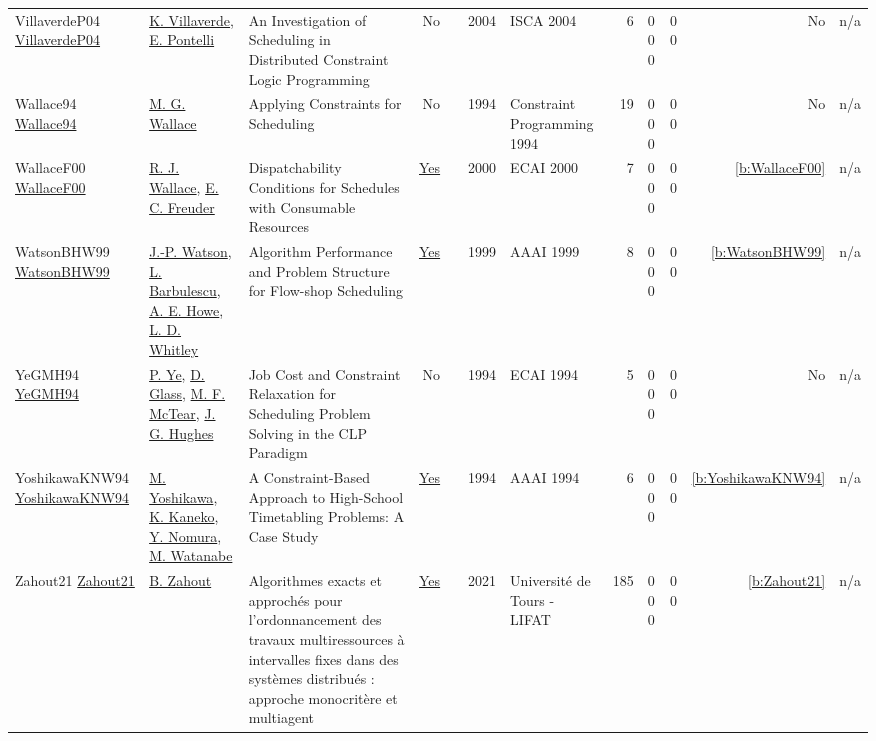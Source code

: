 {\begin{longtable}{>{\raggedright\arraybackslash}p{3cm}>{\raggedright\arraybackslash}p{4.5cm}>{\raggedright\arraybackslash}p{6.0cm}rrrp{2.5cm}rp{1cm}p{1cm}rr}
VillaverdeP04 \href{}{VillaverdeP04} & \hyperref[auth:a658]{K. Villaverde}, \hyperref[auth:a33]{E. Pontelli} & An Investigation of Scheduling in Distributed Constraint Logic Programming & No & \cite{VillaverdeP04} & 2004 & ISCA 2004 & 6 & 0 0 0 & 0 0 & No & n/a\\
Wallace94 \href{}{Wallace94} & \hyperref[auth:a117]{M. G. Wallace} & Applying Constraints for Scheduling & No & \cite{Wallace94} & 1994 & Constraint Programming 1994 & 19 & 0 0 0 & 0 0 & No & n/a\\
WallaceF00 \href{}{WallaceF00} & \hyperref[auth:a1269]{R. J. Wallace}, \hyperref[auth:a273]{E. C. Freuder} & Dispatchability Conditions for Schedules with Consumable Resources & \href{../works/WallaceF00.pdf}{Yes} & \cite{WallaceF00} & 2000 & ECAI 2000 & 7 & 0 0 0 & 0 0 & \ref{b:WallaceF00} & n/a\\
WatsonBHW99 \href{http://www.aaai.org/Library/AAAI/1999/aaai99-098.php}{WatsonBHW99} & \hyperref[auth:a360]{J.-P. Watson}, \hyperref[auth:a1315]{L. Barbulescu}, \hyperref[auth:a1316]{A. E. Howe}, \hyperref[auth:a1317]{L. D. Whitley} & Algorithm Performance and Problem Structure for Flow-shop Scheduling & \href{../works/WatsonBHW99.pdf}{Yes} & \cite{WatsonBHW99} & 1999 & AAAI 1999 & 8 & 0 0 0 & 0 0 & \ref{b:WatsonBHW99} & n/a\\
YeGMH94 \href{}{YeGMH94} & \hyperref[auth:a1258]{P. Ye}, \hyperref[auth:a1259]{D. Glass}, \hyperref[auth:a1260]{M. F. McTear}, \hyperref[auth:a1261]{J. G. Hughes} & Job Cost and Constraint Relaxation for Scheduling Problem Solving in the {CLP} Paradigm & No & \cite{YeGMH94} & 1994 & ECAI 1994 & 5 & 0 0 0 & 0 0 & No & n/a\\
YoshikawaKNW94 \href{http://www.aaai.org/Library/AAAI/1994/aaai94-171.php}{YoshikawaKNW94} & \hyperref[auth:a1280]{M. Yoshikawa}, \hyperref[auth:a1281]{K. Kaneko}, \hyperref[auth:a1282]{Y. Nomura}, \hyperref[auth:a1283]{M. Watanabe} & A Constraint-Based Approach to High-School Timetabling Problems: {A} Case Study & \href{../works/YoshikawaKNW94.pdf}{Yes} & \cite{YoshikawaKNW94} & 1994 & AAAI 1994 & 6 & 0 0 0 & 0 0 & \ref{b:YoshikawaKNW94} & n/a\\
Zahout21 \href{https://hal.science/tel-03606639}{Zahout21} & \hyperref[auth:a889]{B. Zahout} & {Algorithmes exacts et approch{\'e}s pour l'ordonnancement des travaux multiressources {\`a} intervalles fixes dans des syst{\`e}mes distribu{\'e}s : approche monocrit{\`e}re et multiagent} & \href{../works/Zahout21.pdf}{Yes} & \cite{Zahout21} & 2021 & {Universit{\'e} de Tours - LIFAT} & 185 & 0 0 0 & 0 0 & \ref{b:Zahout21} & n/a\\

\end{longtable}}
